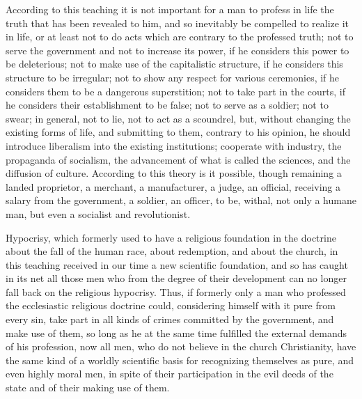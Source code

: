\documentclass{book}
\begin{document}
According to this teaching it is not important for a man to profess in life the truth that has been revealed to him, and so inevitably be compelled to realize it in life, or at least not to do acts which are contrary to the professed truth; not to serve the government and not to increase its power, if he considers this power to be deleterious; not to make use of the capitalistic structure, if he considers this structure to be irregular; not to show any respect for various ceremonies, if he considers them to be a dangerous superstition; not to take part in the courts, if he considers their establishment to be false; not to serve as a soldier; not to swear; in general, not to lie, not to act as a scoundrel, but, without changing the existing forms of life, and submitting to them, contrary to his opinion, he should introduce liberalism into the existing institutions; cooperate with industry, the propaganda of socialism, the advancement of what is called the sciences, and the diffusion of culture. According to this theory is it possible, though remaining a landed proprietor, a merchant, a manufacturer, a judge, an official, receiving a salary from the government, a soldier, an officer, to be, withal, not only a humane man, but even a socialist and revolutionist.

Hypocrisy, which formerly used to have a religious foundation in the doctrine about the fall of the human race, about redemption, and about the church, in this teaching received in our time a new scientific foundation, and so has caught in its net all those men who from the degree of their development can no longer fall back on the religious hypocrisy. Thus, if formerly only a man who professed the ecclesiastic religious doctrine could, considering himself with it pure from every sin, take part in all kinds of crimes committed by the government, and make use of them, so long as he at the same time fulfilled the external demands of his profession, now all men, who do not believe in the church Christianity, have the same kind of a worldly scientific basis for recognizing themselves as pure, and even highly moral men, in spite of their participation in the evil deeds of the state and of their making use of them.
\end{document}

